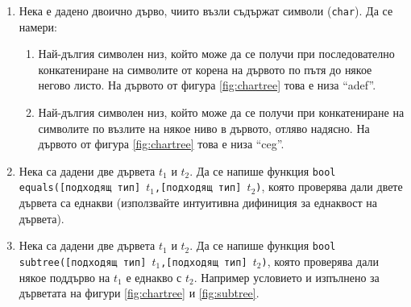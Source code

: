 \begin{enumerate}[resume]
  \item Нека е дадено двоично дърво, чиито възли съдържат символи (\texttt{char}). Да се намери:
  
  \begin{enumerate}[label=\alph*)]
    \item Най-дългия символен низ, който може да се получи при последователно конкатениране на символите от корена на дървото по пътя до някое негово листо. На дървото от фигура \ref{fig:chartree} това е низа ``adef''.
    \item Най-дългия символен низ, който може да се получи при конкатениране на символите по възлите на някое ниво в дървото, отляво надясно. На дървото от фигура \ref{fig:chartree} това е низа ``ceg''.
  \end{enumerate}

  \item Нека са дадени две дървета $t_1$ и $t_2$. Да се напише функция \texttt{bool equals([подходящ тип] $t_1$,[подходящ тип] $t_2$)}, която проверява дали двете дървета са еднакви (използвайте интуитивна дифиниция за еднаквост на дървета).

  \item Нека са дадени две дървета $t_1$ и $t_2$. Да се напише функция \texttt{bool subtree([подходящ тип] $t_1$,[подходящ тип] $t_2$)}, която проверява дали някое поддърво на $t_1$ е еднакво с $t_2$. Например условието и изпълнено за дърветата на фигури \ref{fig:chartree} и \ref{fig:subtree}.

\end{enumerate}


